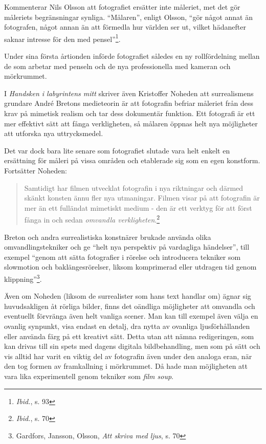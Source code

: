 \documentclass[
]{article}
\begin{document}
Kommenterar Nils Olsson att fotografiet ersätter inte måleriet, met det
gör måleriets begränsningar synliga. ``Målaren'', enligt Olsson, ``gör
något annat än fotografen, något annan än att förmedla hur världen ser
ut, vilket hädanefter saknar intresse för den med pensel''\footnote{\textit{Ibid.}, s. 93}.

Under sina första årtionden införde fotografiet således en ny
rollfördelning mellan de som arbetar med penseln och de nya
professionella med kameran och mörkrummet.

I \emph{Handsken i labyrintens mitt} skriver även Kristoffer Noheden
att surrealismens grundare André Bretons medieteorin är att fotografin
befriar måleriet från dess krav på mimetisk realism och tar dess
dokumentär funktion. Ett fotografi är ett mer effektivt sätt att fånga
verkligheten, så målaren öppnas helt nya möjligheter att utforska nya
uttrycksmedel.

Det var dock bara lite senare som fotografiet slutade vara helt enkelt
en ersättning för måleri på vissa områden och etablerade sig som en egen
konstform. Fortsätter Noheden:

\begin{quote}
Samtidigt har filmen utvecklat fotografin i nya riktningar och därmed
skänkt konsten ännu fler nya utmaningar. Filmen visar på att fotografin
är mer än ett fulländat mimetiskt medium - den är ett verktyg för att
först fånga in och sedan \emph{omvandla verkligheten}.\footnote{\textit{Ibid.}, s. 70}
\end{quote}

Breton och andra surrealistiska konstnärer brukade använda olika
omvandlingstekniker och ge ``helt nya perspektiv på vardagliga
händelser'', till exempel ``genom att sätta fotografier i rörelse och
introducera tekniker som slowmotion och baklängesrörelser, liksom
komprimerad eller utdragen tid genom klippning''\footnote{Gardfors, Jansson, Olsson, \textit{Att skriva med ljus}, s. 70}.

Även om Noheden (liksom de surrealister som hans text handlar om) ägnar
sig huvudsakligen åt rörliga bilder, finns det oändliga möjligheter att
omvandla och eventuellt förvränga även helt vanliga scener. Man kan till
exempel även välja en ovanlig synpunkt, visa endast en detalj, dra nytta
av ovanliga ljusförhållanden eller använda färg på ett kreativt sätt.
Detta utan att nämna redigeringen, som kan drivas till sin spets med
dagens digitala bildbehandling, men som på sätt och vis alltid har varit
en viktig del av fotografin även under den analoga eran, när den tog
formen av framkallning i mörkrummet. Då hade man möjligheten att vara
lika experimentell genom tekniker som \emph{film soup}.
\end{document}
